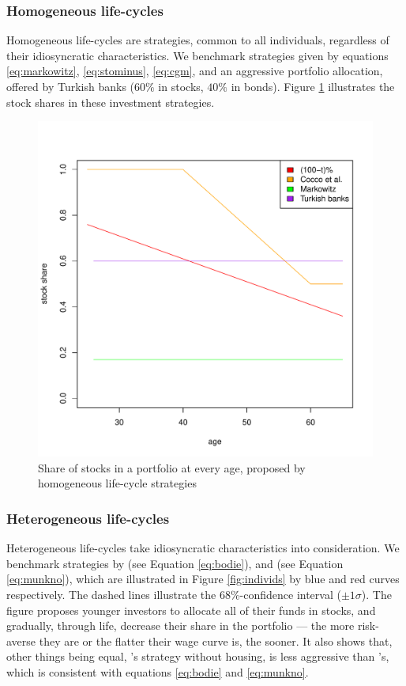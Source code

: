 \documentclass[]{elsarticle}
\begin{document}
\subsubsection{Homogeneous life-cycles}

Homogeneous life-cycles are strategies, common to all individuals, regardless of their idiosyncratic characteristics. We benchmark strategies given by equations \ref{eq:markowitz}, \ref{eq:stominus}, \ref{eq:cgm}, and an aggressive portfolio allocation, offered by Turkish banks ($60\%$ in stocks, $40\%$ in bonds). Figure \ref{fig:defaults} illustrates the stock shares in these investment strategies.


\begin{figure}[h!]
	\centering
	\includegraphics[scale=0.4]{figs/defaults.pdf}
	\caption{Share of stocks in a portfolio at every age, proposed by homogeneous life-cycle strategies}
	\label{fig:defaults}
\end{figure}


\subsubsection{Heterogeneous life-cycles}

Heterogeneous life-cycles take idiosyncratic characteristics into consideration. We benchmark strategies by \citet{bodie} (see Equation \ref{eq:bodie}), and \citet{munk} (see Equation \ref{eq:munkno}), which are illustrated in Figure \ref{fig:individs} by blue and red curves respectively. The dashed lines illustrate the $68\%$-confidence interval ($\pm 1\sigma$). The figure proposes younger investors to allocate all of their funds in stocks, and gradually, through life, decrease their share in the portfolio --- the more risk-averse they are or the flatter their wage curve is, the sooner. It also shows that, other things being equal, \citet{munk}'s strategy without housing, is less aggressive than \citet{bodie}'s, which is consistent with equations \ref{eq:bodie} and \ref{eq:munkno}. 
\end{document}
